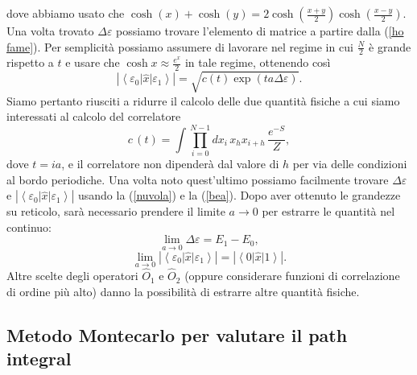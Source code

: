 \documentclass{article}
\begin{document}
dove abbiamo usato che $\cosh(x)+\cosh(y)=2\cosh\left(\frac{x+y}{2}\right)\cosh\left(\frac{x-y}{2}\right).$\\
Una volta trovato $\Delta\varepsilon$ possiamo trovare l'elemento di matrice a partire dalla (\ref{ho fame}). Per semplicità possiamo assumere di lavorare nel regime in cui $\frac{N}{2}$ è grande rispetto a $t$ e usare che $\cosh x\approx \frac{e^x}{2}$ in tale regime, ottenendo così 
\begin{equation}
    \label{bea}
    \left|\left<\varepsilon_0\right|\hat{x}\left|\varepsilon_1\right>\right|=\sqrt{c(t)\exp{\left(ta\Delta\varepsilon\right)}}.
\end{equation}
Siamo pertanto riusciti a ridurre il calcolo delle due quantità fisiche a cui siamo interessati al calcolo del correlatore 
\begin{equation}
    \label{correlatore}
    c\,(t)=\int \prod_{i=0}^{N-1} dx_i\, x_hx_{i+h}\,\frac{e^{-S}}{Z},
\end{equation}
dove $t=ia$, e il correlatore non dipenderà dal valore di $h$ per via delle condizioni al bordo periodiche. Una volta noto quest'ultimo possiamo facilmente trovare $\Delta\varepsilon$ e $\left|\left<\varepsilon_0\right|\hat{x}\left|\varepsilon_1\right>\right|$ usando la (\ref{nuvola}) e la (\ref{bea}). Dopo aver ottenuto le grandezze su reticolo, sarà necessario prendere il limite $a\rightarrow 0$ per estrarre le quantità nel continuo:
\begin{equation}
    \lim_{a\rightarrow0}\Delta\varepsilon=E_1-E_0,
\end{equation}
\begin{equation}
    \lim_{a\rightarrow0}\left|\left<\varepsilon_0\right|\hat{x}\left|\varepsilon_1\right>\right|=\left|\left<0\right|\hat{x}\left|1\right>\right|.
\end{equation}
Altre scelte degli operatori $\hat{O}_1$ e $\hat{O}_2$ (oppure considerare funzioni di correlazione di ordine più alto) danno la possibilità di estrarre altre quantità fisiche.








\subsection{Metodo Montecarlo per valutare il path integral}
\end{document}
